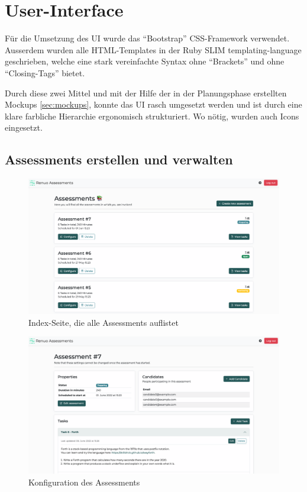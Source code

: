 \section{User-Interface}

Für die Umsetzung des UI wurde das \enquote{Bootstrap} CSS-Framework verwendet. Ausserdem wurden alle
HTML-Templates in der Ruby SLIM templating-language geschrieben, 
welche eine stark vereinfachte Syntax ohne \enquote{Brackets} und ohne \enquote{Closing-Tags} bietet.

Durch diese zwei Mittel und mit der Hilfe der in der Planungsphase erstellten Mockups \ref{sec:mockups}, konnte das UI
rasch umgesetzt werden und ist durch eine klare farbliche Hierarchie ergonomisch strukturiert. Wo nötig, wurden auch
Icons eingesetzt.

\subsection{Assessments erstellen und verwalten}

\begin{figure}[H]
  \centering
  \includegraphics[width=\textwidth]{images/ui/assessments-index.png}
  \caption{\label{fig:assessments-index}Index-Seite, die alle Assessments auflistet}
\end{figure}

\begin{figure}[H]
  \centering
  \includegraphics[width=\textwidth]{images/ui/assessments-edit.png}
  \caption{\label{fig:assessments-edit}Konfiguration des Assessments}
\end{figure}

